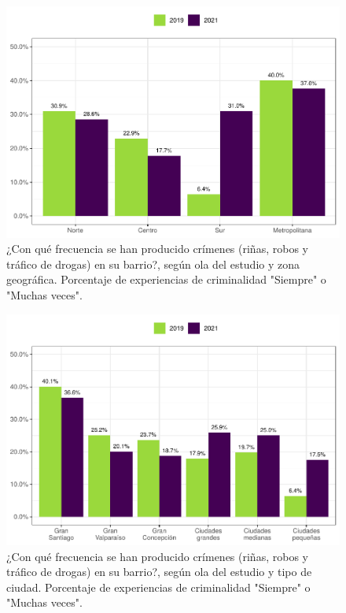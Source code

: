 \documentclass[
  12pt,
]{book}
\begin{document}
\begin{figure}

{\centering \includegraphics{reporte-elsoc_files/figure-latex/crim-zona-1} 

}

\caption{¿Con qué frecuencia se han producido crímenes (riñas, robos y tráfico de drogas) en su barrio?, según ola del estudio y zona geográfica. Porcentaje de experiencias de criminalidad "Siempre" o "Muchas veces".}\label{fig:crim-zona}
\end{figure}

\begin{figure}

{\centering \includegraphics{reporte-elsoc_files/figure-latex/crim-estrato-1} 

}

\caption{¿Con qué frecuencia se han producido crímenes (riñas, robos y tráfico de drogas) en su barrio?, según ola del estudio y tipo de ciudad. Porcentaje de experiencias de criminalidad "Siempre" o "Muchas veces".}\label{fig:crim-estrato}
\end{figure}
\end{document}
